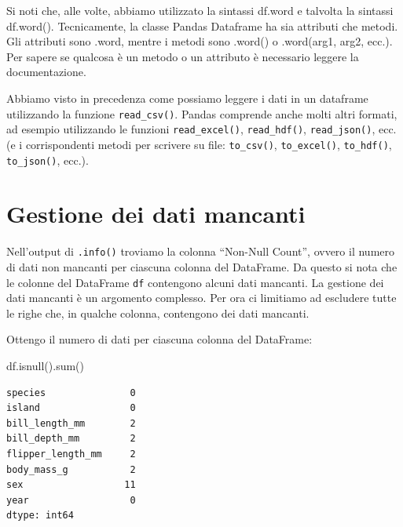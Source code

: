 \documentclass[
  letterpaper,
  krantz2]{{[}./krantz{]}}
\newenvironment{Shaded}{\begin{snugshade}}{\end{snugshade}}
\newcommand{\BuiltInTok}[1]{\textcolor[rgb]{0.00,0.23,0.31}{#1}}
\newcommand{\NormalTok}[1]{\textcolor[rgb]{0.00,0.23,0.31}{#1}}
\begin{document}
\begin{Shaded}
\begin{Highlighting}[]
\NormalTok{Si noti che, alle volte, abbiamo utilizzato la sintassi \textasciigrave{}df.word\textasciigrave{} e talvolta la sintassi \textasciigrave{}df.word()\textasciigrave{}. Tecnicamente, la classe Pandas Dataframe ha sia attributi che metodi. Gli attributi sono \textasciigrave{}.word\textasciigrave{}, mentre i metodi sono \textasciigrave{}.word()\textasciigrave{} o \textasciigrave{}.word(arg1, arg2, ecc.)\textasciigrave{}. Per sapere se qualcosa è un metodo o un attributo è necessario leggere la documentazione.}
\end{Highlighting}
\end{Shaded}

Abbiamo visto in precedenza come possiamo leggere i dati in un dataframe
utilizzando la funzione \texttt{read\_csv()}. Pandas comprende anche
molti altri formati, ad esempio utilizzando le funzioni
\texttt{read\_excel()}, \texttt{read\_hdf()}, \texttt{read\_json()},
ecc. (e i corrispondenti metodi per scrivere su file:
\texttt{to\_csv()}, \texttt{to\_excel()}, \texttt{to\_hdf()},
\texttt{to\_json()}, ecc.).

\section{Gestione dei dati mancanti}\label{gestione-dei-dati-mancanti}

Nell'output di \texttt{.info()} troviamo la colonna ``Non-Null Count'',
ovvero il numero di dati non mancanti per ciascuna colonna del
DataFrame. Da questo si nota che le colonne del DataFrame \texttt{df}
contengono alcuni dati mancanti. La gestione dei dati mancanti è un
argomento complesso. Per ora ci limitiamo ad escludere tutte le righe
che, in qualche colonna, contengono dei dati mancanti.

Ottengo il numero di dati per ciascuna colonna del DataFrame:

\begin{Shaded}
\begin{Highlighting}[]
\NormalTok{df.isnull().}\BuiltInTok{sum}\NormalTok{()}
\end{Highlighting}
\end{Shaded}

\begin{verbatim}
species               0
island                0
bill_length_mm        2
bill_depth_mm         2
flipper_length_mm     2
body_mass_g           2
sex                  11
year                  0
dtype: int64
\end{verbatim}
\end{document}
